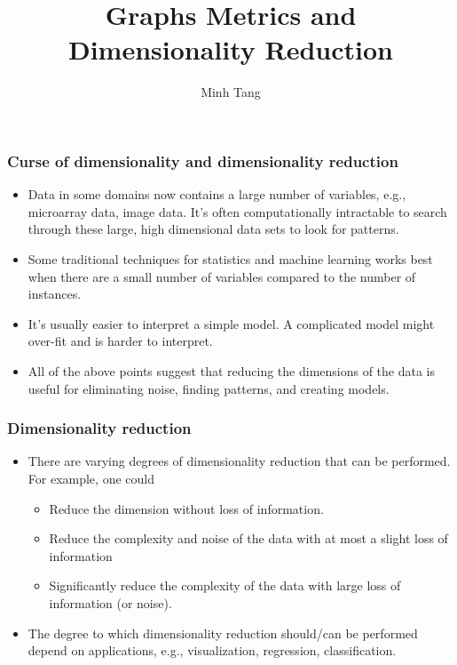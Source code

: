 \documentclass[professionalfonts, hyperref={pdfpagelabels=false,
  colorlinks=true, linkcolor=purple}]{beamer}
\begin{document}
\title[Graphs Metrics and Dimensionality Reduction]{Graphs Metrics and
  Dimensionality Reduction}
\author[Tang]{Minh Tang}

\begin{frame}
\titlepage
\end{frame}

\begin{frame}
  \frametitle{Curse of dimensionality and dimensionality reduction}
  \begin{itemize}
  \item Data in some domains now contains a large number of variables,
    e.g., microarray data, image data. It's often computationally
    intractable to search through these large, high dimensional data sets to
    look for patterns.
  \item Some traditional techniques for statistics and machine
    learning works best when there are a small number of variables
    compared to the number of instances. 
  \item It's usually easier to interpret a simple model. A complicated
    model might over-fit and is harder to interpret.
  \item All of the above points suggest that reducing the
    dimensions of the data is useful for eliminating noise, finding
    patterns, and creating models. 
  \end{itemize}
\end{frame}

\begin{frame}
  \frametitle{Dimensionality reduction}
  \begin{itemize}
  \item There are varying degrees of dimensionality reduction that can
    be performed. For example, one could 
    \begin{itemize}
    \item Reduce the dimension without loss of information. 
    \item Reduce the complexity and noise of the data with at most a
      slight loss of information
    \item Significantly reduce the complexity of the data with large
      loss of information (or noise). 
    \end{itemize}
  \item The degree to which dimensionality reduction should/can be
    performed depend on applications, e.g., visualization, regression,
    classification.  
  \end{itemize}
\end{frame}
\end{document}
